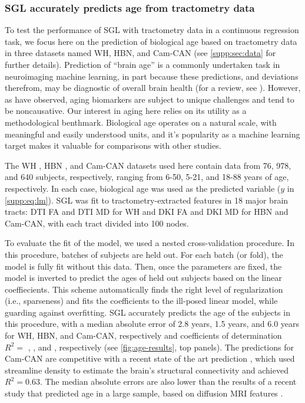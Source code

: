 \subsubsection*{SGL accurately predicts age from tractometry data}

To test the performance of SGL with tractometry data in a continuous
regression task, we focus here on the prediction of biological age based on
tractometry data in three datasets named WH, HBN, and Cam-CAN (see
\cref{supp:sec:data} for further details). Prediction of ``brain age'' is a
commonly undertaken task in neuroimaging machine learning, in part because
these predictions, and deviations therefrom, may be diagnostic of overall
brain health (for a review, see \textcite{Cole2019-rz}). However, as
\textcite{nelson2019biomarkers} have observed, aging biomarkers are subject
to unique challenges and tend to be noncausative. Our interest in aging here
relies on its utility as a methodological benthmark. Biological age operates
on a natural scale, with meaningful and easily understood units, and it's
popularity as a machine learning target makes it valuable for comparisons
with other studies.

The WH \cite{yeatman2014lifespan}, HBN \cite{alexander2017open}, and Cam-CAN
\cite{shafto2014cambridge,taylor2017cambridge} datasets used here contain
data from 76, 978, and 640 subjects, respectively, ranging from 6-50, 5-21,
and 18-88 years of age, respectively. In each case, biological age was used
as the predicted variable ($y$ in \cref{supp:eq:lm}). SGL was fit to
tractometry-extracted features in 18 major brain tracts: DTI FA and DTI MD
for WH and DKI FA and DKI MD for HBN and Cam-CAN, with each tract divided
into 100 nodes.

To evaluate the fit of the model, we used a nested cross-validation
procedure. In this procedure, batches of subjects are held out. For each
batch (or fold), the model is fully fit without this data. Then, once the
parameters are fixed, the model is inverted to predict the ages of held out
subjects based on the linear coeffiecients. This scheme automatically finds
the right level of regularization (i.e., sparseness) and fits the
coefficients to the ill-posed linear model, while guarding against
overfitting. SGL accurately predicts the age of the subjects in this
procedure, with a median absolute error of 2.8 years, 1.5 years, and 6.0
years for WH, HBN, and Cam-CAN, respectively and coefficients of
determination $R^2 = $ {\whRsq} , {\hbnRsq}, and {\camcanRsq}, respectively (see
\cref{fig:age-results}, top panels). The predictions for Cam-CAN are
competitive with a recent state of the art prediction
\cite{mcpherson2020single}, which used streamline density to estimate the
brain's structural connectivity and achieved $R^2 = 0.63$. The median
absolute errors are also lower than the results of a recent study that
predicted age in a large sample, based on diffusion MRI features
\cite{Richard2018-ux}.

